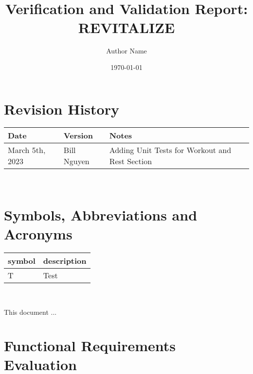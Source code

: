 \documentclass[12pt, titlepage]{article}
\begin{document}
\title{Verification and Validation Report: REVITALIZE} 
\author{Author Name}
\date{\today}

\maketitle


\section{Revision History}

\begin{tabularx}{\textwidth}{p{3cm}p{2cm}X}
	\toprule {\bf Date} & {\bf Version} & {\bf Notes}\\
	\midrule
	March 5th, 2023 & Bill Nguyen & Adding Unit Tests for Workout and Rest Section\\
	\bottomrule
\end{tabularx}

~\newpage

\section{Symbols, Abbreviations and Acronyms}

\renewcommand{\arraystretch}{1.2}
\begin{tabular}{l l} 
	\toprule		
	\textbf{symbol} & \textbf{description}\\
	\midrule 
	T & Test\\
	\bottomrule
\end{tabular}\\


\newpage

\tableofcontents

\listoftables %

\listoffigures %

\newpage


This document ...

\section{Functional Requirements Evaluation}
\end{document}
